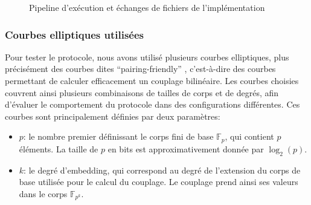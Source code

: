 \documentclass[10pt,a4paper]{article}
\theoremstyle{definition}
\theoremstyle{plain}
\theoremstyle{remark}
\begin{document}
\begin{figure}[H]

    \caption{Pipeline d'exécution et échanges de fichiers de l'implémentation}
    
\end{figure}


\subsubsection{Courbes elliptiques utilisées}
Pour tester le protocole, nous avons utilisé plusieurs courbes elliptiques, 
plus précisément des courbes dites ``pairing-friendly'' \cite{afg2024,guillevic2025,aeg2022}, 
c'est-à-dire des courbes permettant de calculer efficacement un couplage bilinéaire. 
Les courbes choisies couvrent ainsi plusieurs combinaisons de tailles de corps et de degrés,
afin d'évaluer le comportement du protocole dans des configurations différentes.
Ces courbes sont principalement définies par deux paramètres:
\begin{itemize}

    \item $p$: le nombre premier définissant le corps fini de base $\mathbb{F}_p$, qui contient $p$ éléments. La taille de $p$ en bits est approximativement donnée par $\log_2(p)$.

    \item $k$: le degré d'embedding, qui correspond au degré de l'extension du corps de base utilisée pour le calcul du couplage. Le couplage prend ainsi ses valeurs dans le corps $\mathbb{F}_{p^k}$.

\end{itemize}
\end{document}
